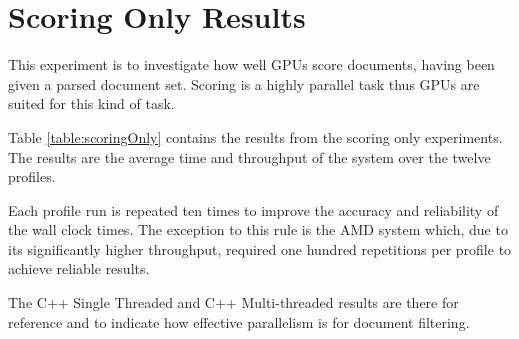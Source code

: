 \section{Scoring Only Results}

This experiment is to investigate how well GPUs score documents, having been
given a parsed document set. Scoring is a highly parallel task thus GPUs are
suited for this kind of task.

Table \ref{table:scoringOnly} contains the results from the scoring only
experiments. The results are the average time and throughput of the system over
the twelve profiles.

Each profile run is repeated ten times to improve the accuracy and reliability
of the wall clock times. The exception to this rule is the AMD system which, due
to its significantly higher throughput, required one hundred repetitions per
profile to achieve reliable results.

The C++ Single Threaded and C++ Multi-threaded results are there for reference
and to indicate how effective parallelism is for document filtering.

